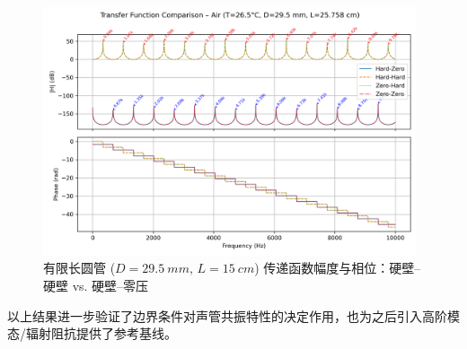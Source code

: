 \documentclass[12pt,a4paper]{article}
\begin{document}
\begin{figure}[h]
    \centering
    \includegraphics[width=0.98\textwidth]{../02-code/tube_transfer_compare.png}
    \caption{有限长圆管 ($D=\SI{29.5}{mm},\,L=\SI{15}{cm}$) 传递函数幅度与相位：硬壁--硬壁 vs. 硬壁--零压}
    \label{fig:tube-tf-compare}
\end{figure}

以上结果进一步验证了边界条件对声管共振特性的决定作用，也为之后引入高阶模态/辐射阻抗提供了参考基线。
\end{document}
